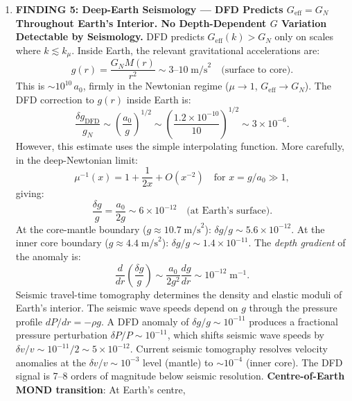 \documentclass[11pt]{article}
\theoremstyle{definition}
\theoremstyle{remark}
\newcommand{\ee}[1]{\times10^{#1}}
\newcommand{\Geff}{G_{\mathrm{eff}}}
\begin{document}
\begin{tcolorbox}[colback=blue!5!white, colframe=blue!60!black,
  title=\textbf{TOP 5 FINDINGS --- W4i16 P6 (Ranked by Impact)}]
\begin{enumerate}[nosep]
\item \textbf{FINDING 5: Deep-Earth Seismology ---
  DFD Predicts $\Geff = G_N$ Throughout Earth's Interior.
  No Depth-Dependent $G$ Variation Detectable by Seismology.}
  DFD predicts $\Geff(k) > G_N$ only on scales where
  $k \lesssim k_\mu$.  Inside Earth, the relevant gravitational
  accelerations are:
  \begin{equation}
  g(r) = \frac{G_N M(r)}{r^2} \sim 3\text{--}10\;\mathrm{m/s}^2
    \quad\text{(surface to core)}.
  \end{equation}
  This is $\sim 10^{10}\,a_0$, firmly in the Newtonian regime
  ($\mu \to 1$, $\Geff \to G_N$).  The DFD correction to
  $g(r)$ inside Earth is:
  \begin{equation}
  \frac{\delta g_{\mathrm{DFD}}}{g_N} \sim \left(\frac{a_0}{g}\right)^{1/2}
    \sim \left(\frac{1.2\ee{-10}}{10}\right)^{1/2}
    \sim 3\ee{-6}.
  \end{equation}
  However, this estimate uses the simple interpolating function.
  More carefully, in the deep-Newtonian limit:
  \begin{equation}
  \mu^{-1}(x) = 1 + \frac{1}{2x} + O(x^{-2}) \quad\text{for }
    x = g/a_0 \gg 1,
  \end{equation}
  giving:
  \begin{equation}
  \frac{\delta g}{g} = \frac{a_0}{2g} \sim 6\ee{-12}
    \quad\text{(at Earth's surface)}.
  \end{equation}
  At the core-mantle boundary ($g \approx 10.7\;\mathrm{m/s}^2$):
  $\delta g/g \sim 5.6\ee{-12}$.
  At the inner core boundary ($g \approx 4.4\;\mathrm{m/s}^2$):
  $\delta g/g \sim 1.4\ee{-11}$.
  The \emph{depth gradient} of the anomaly is:
  \begin{equation}
  \frac{d}{dr}\left(\frac{\delta g}{g}\right) \sim
    \frac{a_0}{2g^2}\frac{dg}{dr} \sim 10^{-12}\;\mathrm{m}^{-1}.
  \end{equation}
  Seismic travel-time tomography determines the density
  and elastic moduli of Earth's interior.  The seismic wave
  speeds depend on $g$ through the pressure profile
  $dP/dr = -\rho g$.  A DFD anomaly of $\delta g/g \sim 10^{-11}$
  produces a fractional pressure perturbation
  $\delta P/P \sim 10^{-11}$, which shifts seismic wave
  speeds by $\delta v/v \sim 10^{-11}/2 \sim 5\ee{-12}$.
  Current seismic tomography resolves velocity anomalies at the
  $\delta v/v \sim 10^{-3}$ level (mantle) to $\sim 10^{-4}$
  (inner core).  The DFD signal is 7--8 orders of magnitude
  below seismic resolution.
  \textbf{Centre-of-Earth MOND transition}: At Earth's centre,

\end{enumerate}
\end{tcolorbox}
\end{document}
